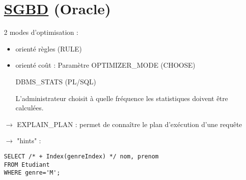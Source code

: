 \documentclass{article}
\begin{document}
\section*{\underline{SGBD} (Oracle)}

2 modes d'optimisation : 
\begin{itemize}\renewcommand{\labelitemi}{$\bullet$}
	\item orienté règles (RULE)
	\item orienté coût : Paramètre OPTIMIZER\_MODE (CHOOSE)

DBMS\_STATS (PL/SQL)

L'administrateur choisit à quelle fréquence les statistiques doivent être calculées.
\end{itemize}

$\rightarrow$ EXPLAIN\_PLAN : permet de connaître le plan d'exécution d'une requête 

$\rightarrow$ "hints" : 

\lstset{language=SQL, frame=none, numbers=none}
\begin{lstlisting}
SELECT /* + Index(genreIndex) */ nom, prenom
FROM Etudiant
WHERE genre='M';
\end{lstlisting}
\end{document}
